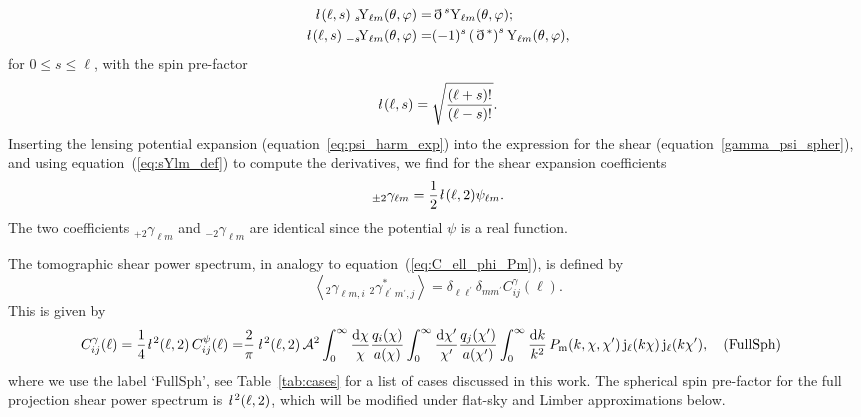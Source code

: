 \documentclass[fleqn,usenatbib]{mnras} %
\newcommand{\ellbar}{\hbox{\it \l}\,}
\newcommand{\pref}{{\cal A}}
\newcommand{\edth}{\,\eth\,}
\newcommand{\Label}[1]{\quad (\mbox{#1})}
\begin{document}
%
%
\begin{align}
  \ellbar(\ell, s) \; _s\!{\rm Y}_{\ell m}(\theta, \varphi) = & \edth^s {\rm Y}_{\ell m}(\theta, \varphi);
    \nonumber \\
  \ellbar(\ell, s) \; _{-s}\!{\rm Y}_{\ell m}(\theta, \varphi) = & (-1)^s \left(\edth^\ast\right)^s {\rm Y}_{\ell m}(\theta, \varphi),
  \label{eq:sYlm_def} 
\end{align}
%
for $0 \le s \le \ell$, with the spin pre-factor \citep{2012PhRvD..86b3001B}
%
\begin{equation}
  \ellbar(\ell, s) = \sqrt{\frac{(\ell + s)!}{(\ell - s)!}}.
  \label{eq:ellbar}
\end{equation} 
%
Inserting the lensing potential expansion (equation~\ref{eq:psi_harm_exp}) into the
expression for the shear (equation~\ref{gamma_psi_spher}), and using equation~(\ref{eq:sYlm_def})
to compute the derivatives, we find for the shear expansion coefficients
\citep{2000PhRvD..62d3007H,2001astro.ph.11605T}
%
%
\begin{equation}
  _{\pm 2} \gamma_{\ell m} = \frac 1 2 \ellbar(\ell, 2) \psi_{\ell m}.
  \label{eq:gamma_ellm_phi_ellm}
\end{equation}
%
The two coefficients $_{+2} \gamma_{\ell m}$ and $_{-2} \gamma_{\ell m}$ are
identical since the potential $\psi$ is a real function.

The tomographic shear power spectrum, in analogy to equation~(\ref{eq:C_ell_phi_Pm}), is defined by
%
\begin{equation}
  \left\langle _2\gamma^{}_{\ell m, i} \; {}_2\gamma^\ast_{\ell^\prime m^\prime, j} \right\rangle
    = \delta_{\ell \ell^\prime} \delta_{m m^\prime} C^\gamma_{ij}(\ell).
  \label{eq:C_ell_gamma}
\end{equation}
%
This is given by
%
\begin{align}
  C^\gamma_{ij}(\ell) = \frac 1 4 \ellbar^2(\ell, 2) \, C^\psi_{ij}(\ell)
                 = & \frac 2 \pi \, \ellbar^2(\ell, 2) \, \pref^2
                 \int_{0}^\infty \frac{\rm d \chi}{\chi} \frac{q_i(\chi)}{a(\chi)}
                \int_{0}^\infty \frac{\rm d \chi^\prime}{\chi^\prime}
                \frac{q_j(\chi^\prime)}{a(\chi^\prime)}
                \int_0^\infty \frac{{\rm d} k}{k^2} \, P_{\rm m}(k, \chi, \chi^\prime) \,
                {\rm j}_\ell(k \chi) \, {\rm j}_\ell(k \chi^\prime), \Label{FullSph}
  \label{eq:C_ell_full}
\end{align}
%
where we use the label `FullSph', see Table~\ref{tab:cases} for a list of cases discussed in this work.
The spherical spin pre-factor for the full projection shear power
spectrum is $\ellbar^2(\ell, 2)$, which will be modified under
flat-sky and Limber approximations below.
\end{document}
